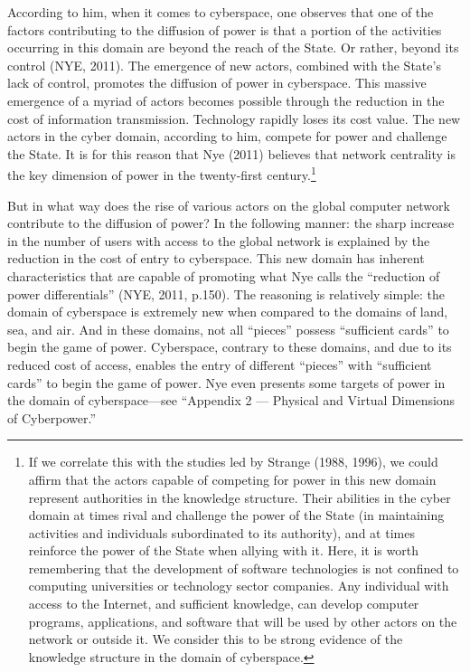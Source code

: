 According to him, when it comes to cyberspace, one observes that one of the factors contributing to the diffusion of power is that a portion of the activities occurring in this domain are beyond the reach of the State. Or rather, beyond its control (NYE, 2011). The emergence of new actors, combined with the State's lack of control, promotes the diffusion of power in cyberspace. This massive emergence of a myriad of actors becomes possible through the reduction in the cost of information transmission. Technology rapidly loses its cost value. The new actors in the cyber domain, according to him, compete for power and challenge the State. It is for this reason that Nye (2011) believes that network centrality is the key dimension of power in the twenty-first century.\footnote{If we correlate this with the studies led by Strange (1988, 1996), we could affirm that the actors capable of competing for power in this new domain represent authorities in the knowledge structure. Their abilities in the cyber domain at times rival and challenge the power of the State (in maintaining activities and individuals subordinated to its authority), and at times reinforce the power of the State when allying with it. Here, it is worth remembering that the development of software technologies is not confined to computing universities or technology sector companies. Any individual with access to the Internet, and sufficient knowledge, can develop computer programs, applications, and software that will be used by other actors on the network or outside it. We consider this to be strong evidence of the knowledge structure in the domain of cyberspace.}

But in what way does the rise of various actors on the global computer network contribute to the diffusion of power? In the following manner: the sharp increase in the number of users with access to the global network is explained by the reduction in the cost of entry to cyberspace. This new domain has inherent characteristics that are capable of promoting what Nye calls the ``reduction of power differentials'' (NYE, 2011, p.150). The reasoning is relatively simple: the domain of cyberspace is extremely new when compared to the domains of land, sea, and air. And in these domains, not all ``pieces'' possess ``sufficient cards'' to begin the game of power. Cyberspace, contrary to these domains, and due to its reduced cost of access, enables the entry of different ``pieces'' with ``sufficient cards'' to begin the game of power. Nye even presents some targets of power in the domain of cyberspace---see ``Appendix 2 --- Physical and Virtual Dimensions of Cyberpower.''

